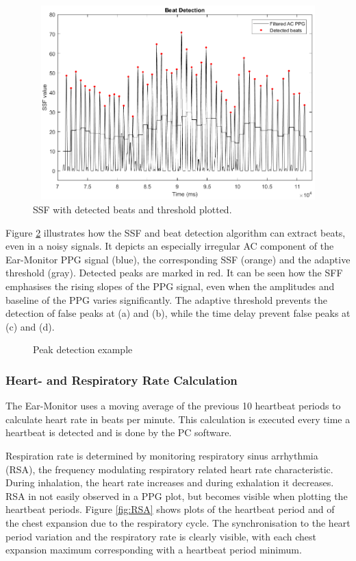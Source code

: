 \begin{figure}[H]
   \centering
   \includegraphics[width=12cm,height=7.5cm]{figs/BeatDetection.png}
   \caption{SSF with detected beats and threshold plotted.}
   \label{fig:BeatDetection}
\end{figure}

Figure \ref{fig:BeatDetectionExample} illustrates how the SSF and beat detection algorithm can extract beats, even in a noisy signals. It depicts an especially irregular AC component of the Ear-Monitor PPG signal (blue), the corresponding SSF (orange) and the adaptive threshold (gray). Detected peaks are marked in red. It can be seen how the SFF emphasises the rising slopes of the PPG signal, even when the amplitudes and baseline of the PPG varies significantly. The adaptive threshold prevents the detection of false peaks at (a) and (b), while the time delay prevent false peaks at (c) and (d).

\begin{figure}[H]
\centering
\graphicspath{{figs/}}

\caption{Peak detection example}
\label{fig:BeatDetectionExample}
\end{figure}

\subsubsection{Heart- and Respiratory Rate Calculation}
The Ear-Monitor uses a moving average of the previous 10 heartbeat periods to calculate heart rate in beats per minute. This calculation is executed every time a heartbeat is detected and is done by the PC software.

\medskip

Respiration rate is determined by monitoring respiratory sinus arrhythmia (RSA), the frequency modulating respiratory related heart rate characteristic. During inhalation, the heart rate increases and during exhalation it decreases. RSA in not easily observed in a PPG plot, but becomes visible when plotting the heartbeat periods. Figure \ref{fig:RSA} shows plots of the heartbeat period and of the chest expansion due to the respiratory cycle. The synchronisation to the heart period variation and the respiratory rate is clearly visible, with each chest expansion maximum corresponding with a heartbeat period minimum.

